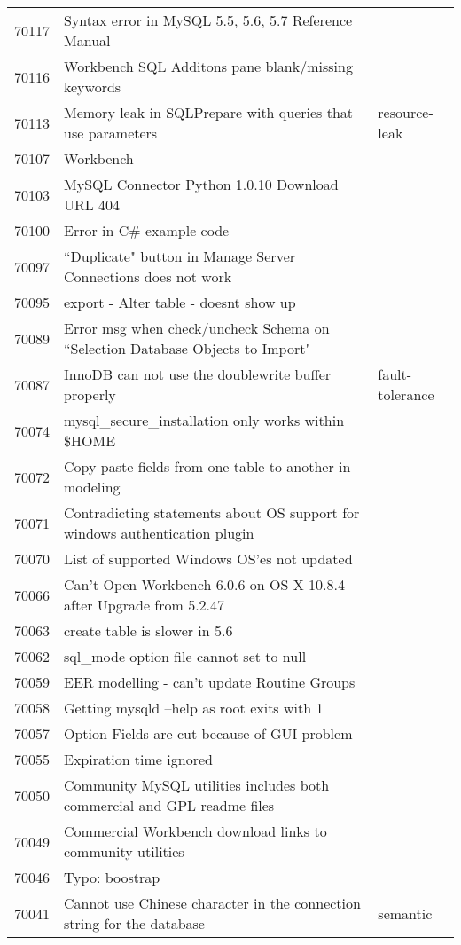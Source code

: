 \begin{longtable}[c]{p{1cm}p{8cm}p{3cm}}
70117 & Syntax error in MySQL 5.5, 5.6, 5.7 Reference Manual &  \\
70116 & Workbench SQL Additons pane blank/missing keywords &  \\
70113 & Memory leak in SQLPrepare with queries that use parameters & resource-leak \\
70107 & Workbench &  \\
70103 & MySQL Connector Python 1.0.10 Download URL 404 &  \\
70100 & Error in C\# example code &  \\
70097 & ``Duplicate" button in Manage Server Connections does not work &  \\
70095 & export - Alter table - doesnt show up &  \\
70089 & Error msg when check/uncheck Schema on ``Selection Database Objects to Import" &  \\
70087 & InnoDB can not use the doublewrite buffer properly & fault-tolerance \\
70074 & mysql\_secure\_installation only works within \$HOME &  \\
70072 & Copy paste fields from one table to another in modeling &  \\
70071 & Contradicting statements about OS support for windows authentication plugin &  \\
70070 & List of supported Windows OS'es not updated &  \\
70066 & Can't Open Workbench 6.0.6 on OS X 10.8.4 after Upgrade from 5.2.47 &  \\
70063 & create table is slower in 5.6 &  \\
70062 & sql\_mode option file cannot set to null &  \\
70059 & EER modelling - can't update Routine Groups &  \\
70058 & Getting mysqld --help as root exits with 1 &  \\
70057 & Option Fields are cut because of GUI problem &  \\
70055 & Expiration time ignored &  \\
70050 & Community MySQL utilities includes both commercial and GPL readme files &  \\
70049 & Commercial Workbench download links to community utilities &  \\
70046 & Typo: boostrap &  \\
70041 & Cannot use Chinese character in the connection string for the database & semantic \\

\end{longtable}

